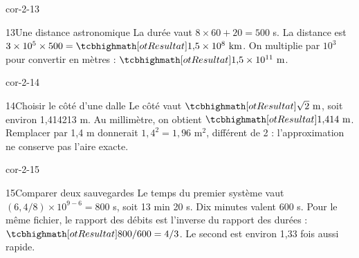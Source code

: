 \begin{blocLivre}{cor-2-13}\begin{corrige}{13}{Une distance astronomique}
La durée vaut $8\times60+20=500$ s. La distance est $3\times10^5\times500=\res{1{,}5\times10^8\text{ km}}$. On multiplie par $10^3$ pour convertir en mètres : $\res{1{,}5\times10^{11}\text{ m}}$.
\end{corrige}\end{blocLivre}
\begin{blocLivre}{cor-2-14}\begin{corrige}{14}{Choisir le côté d’une dalle}
Le côté vaut $\res{\sqrt2\text{ m}}$, soit environ 1,414213 m. Au millimètre, on obtient $\res{1{,}414\text{ m}}$. Remplacer par 1,4 m donnerait $1{,}4^2=1{,}96$ m$^2$, différent de 2 : l’approximation ne conserve pas l’aire exacte.
\end{corrige}\end{blocLivre}
\begin{blocLivre}{cor-2-15}\begin{corrige}{15}{Comparer deux sauvegardes}
Le temps du premier système vaut $(6{,}4/8)\times10^{9-6}=800$ s, soit 13 min 20 s. Dix minutes valent 600 s. Pour le même fichier, le rapport des débits est l’inverse du rapport des durées : $\res{800/600=4/3}$. Le second est environ 1,33 fois aussi rapide.
\end{corrige}\end{blocLivre}
